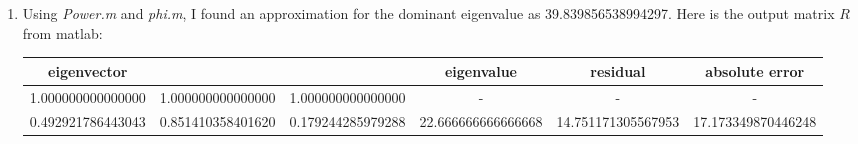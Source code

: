 \documentclass[11pt]{article}
\begin{document}
\begin{exercise}{1}
{\begin{enumerate}[label=\alph*)]
            $$ \lambda _1 = \phi (y_1) / \phi (x_1) = \dfrac{2/\sqrt{10} - 6\sqrt{10}}{-1/\sqrt{10} + 3/\sqrt{10}} = \dfrac{-4/\sqrt{10}}{2/\sqrt{10}} = -2 $$
            $$ x_2 = \dfrac{y_1}{\| y_1 \| _2} = \dfrac{1}{\sqrt{(4/\sqrt{10})^2 + (6/\sqrt{10})^2}} \begin{pmatrix} 2/\sqrt{10} \\ -6/\sqrt{10} \end{pmatrix} = \dfrac{1}{2} \begin{pmatrix} 2/\sqrt{10} \\ -6/\sqrt{10} \end{pmatrix} = \begin{pmatrix} 1/\sqrt{10} \\ -3/\sqrt{10} \end{pmatrix} $$
            Because $\boldx _1 = - \boldx _2 = \begin{pmatrix} -1/\sqrt{10} \\ 3/\sqrt{10} \end{pmatrix} $, we can conclude that our initial guess $\boldx _0$ was an eignvector.
            This means that $\lambda _1 = \lambda _2 = -2$ is an eigenvalue.
            To say whether $-2$ is the dominant eigenvalue, we will compute the eigenvalues of $A$:
            $\det (A - \lambda I) = (7-\lambda)(-1 - \lambda) - 9 = \lambda ^2 - 6 \lambda - 16 = (\lambda - 8)(\lambda + 2) $.
            So the eigenvalues are $8$ and $-2$, therefore $-2$ is not the dominant eigenvalue.
            My reasoning as to why $-2$ is not the dominant eigenvalue for $A$ does not generalize well to higher dimensions since it defeats the whole point of an iterative method (which is supposed to be faster than finding the actual eigenvalues), but it suffices for this example.
            \item Using \textit{Power.m} and \textit{phi.m}, I found an approximation for the dominant eigenvalue as 39.839856538994297.
            Here is the output matrix $R$ from matlab:
            {\scriptsize
            \begin{center}
                \begin{tabular}{|c|c|c|c|c|c|}
                    \hline
                    eigenvector & & & eigenvalue & residual & absolute error \\ \hline
                    1.000000000000000  &  1.000000000000000 &  1.000000000000000 & - &                  -                  &  - \\ \hline
                    0.492921786443043  &  0.851410358401620 &  0.179244285979288 & 22.666666666666668 & 14.751171305567953 &  17.173349870446248 \\ \hline

\end{tabular}
\end{center}}
\end{enumerate}}
\end{exercise}
\end{document}
